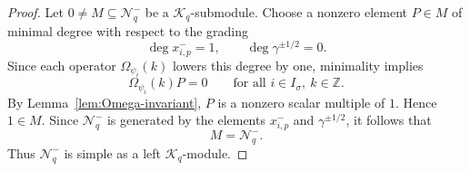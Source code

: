 \documentclass[10pt,a4paper]{amsart}
\newcommand{\mc}[1]{\mathcal{#1}}
\begin{document}
\begin{proof}
Let $0\neq M\subseteq\mc{N}_q^-$ be a $\mc{K}_q$-submodule.
Choose a nonzero element $P\in M$ of minimal degree with respect to
the grading
\[
\deg x^-_{i,p}=1,\qquad
\deg\gamma^{\pm1/2}=0.
\]
Since each operator $\Omega_{\psi_i}(k)$ lowers this degree by one,
minimality implies
\[
\Omega_{\psi_i}(k)P=0
\qquad
\text{for all }i\in I_\sigma,\ k\in\mathbb Z.
\]
By Lemma~\ref{lem:Omega-invariant}, $P$ is a nonzero scalar
multiple of $1$. Hence $1\in M$. Since $\mc{N}_q^-$ is generated by
the elements $x^-_{i,p}$ and $\gamma^{\pm1/2}$, it follows that
\[
M=\mc{N}_q^-.
\]
Thus $\mc{N}_q^-$ is simple as a left $\mc{K}_q$-module.
\end{proof}
\end{document}
